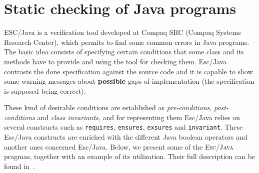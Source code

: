 \documentclass[a4paper]{llncs}
\begin{document}
\section{Static checking of Java programs}
\label{SectStatic}


\label{SubSectEscJava}

ESC/Java is a verification tool developed at
Compaq SRC (Compaq Systems Research Center), which permits to find
some common errors in Java programs. The basic idea consists of
specifying certain conditions that some class and its methods have to
provide and using the tool for checking them. Esc/Java contrasts the
done specification against the source code and it is capable to show
some warning messages about {\bf possible} gaps of implementation (the
specification is supposed being correct).

These kind of desirable conditions are established as
\textit{pre-conditions}, \textit{post-conditions} and \textit{class
invariants}, and for representing them Esc/Java relies on
several constructs such as \texttt{requires}, \texttt{ensures},
\texttt{exsures} and \texttt{invariant}. These Esc/Java constructs are
enriched with the different Java boolean operators and another ones
concerned Esc/Java. Below, we present some of the
\textsc{Esc/Java} pragmas, together with an example of its
utilization. Their full description can be found in~\cite{ESCJavaUrl}.
\end{document}
